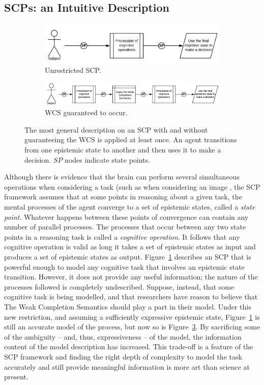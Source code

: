 \documentclass{article}
\begin{document}
\subsection{SCPs: an Intuitive Description}
\begin{figure}
\begin{subfigure}{.4\textwidth}
  \centering
  \includegraphics[width=.95\linewidth]{general}
  \caption{Unrestricted SCP.}
  \label{fig:scp_general}
\end{subfigure}%
\begin{subfigure}{.6\textwidth}
  \centering
  \includegraphics[width=.95\linewidth]{generalWCS}
  \caption{WCS guaranteed to occur.}
  \label{fig:sfig2}
\end{subfigure}
\caption{The most general description on an SCP with and without guaranteeing the WCS is applied at least once. An agent transitions from one epistemic state to another and then uses it to make a decision. $SP$ nodes indicate state points.}
\label{fig:scp_generalWCS}
\end{figure}

Although there is evidence that the brain can perform several simultaneous operations when considering a task (such as when considering an image \citep{sigman2008brain}, the SCP framework assumes that at some points in reasoning about a given task, the mental processes of the agent converge to a set of epistemic states, called a \textit{state point}. Whatever happens between these points of convergence can contain any number of parallel processes. The processes that occur between any two state points in a reasoning task is called a \textit{cognitive operation}. It follows that any cognitive operation is valid as long it takes a set of epistemic states as input and produces a set of epistemic states as output. Figure~\ref{fig:scp_general} describes an SCP that is powerful enough to model any cognitive task that involves an epistemic state transition. However, it does not provide any useful information; the nature of the processes followed is completely undescribed. Suppose, instead, that some cognitive task is being modelled, and that researchers have reason to believe that The Weak Completion Semantics should play a part in their model. Under this new restriction, and assuming a sufficiently expressive epistemic state, Figure~\ref{fig:scp_general} is still an accurate model of the process, but now so is Figure~\ref{fig:scp_generalWCS}. By sacrificing some of the ambiguity -- and, thus, expressiveness -- of the model, the information content of the model description has increased. This trade-off is a feature of the SCP framework and finding the right depth of complexity to model the task accurately and still provide meaningful information is more art than science at present. 
\end{document}
